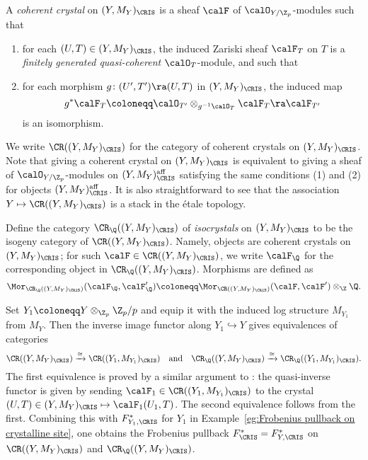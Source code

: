 \begin{defn}
A \emph{coherent crystal} on $(Y,M_Y)_\CRIS$ is a sheaf $\calF$ of $\calO_{Y/\Z_p}$-modules such that 
\begin{enumerate}
    \item for each $(U,T)\in (Y,M_Y)_\CRIS$, the induced Zariski sheaf $\calF_T$ on $T$ is a \emph{finitely generated quasi-coherent} $\calO_T$-module, and such that
    \item for each morphism $g\colon (U',T')\ra (U,T)$ in $(Y,M_Y)_\CRIS$, the induced map
    \[
    g^\ast\calF_T\coloneqq \calO_{T'}\otimes_{g^{-1}\calO_T}\calF_T\ra \calF_{T'}
    \]
    is an isomorphism.
\end{enumerate}
We write $\CR((Y,M_Y)_\CRIS)$ for the category of coherent crystals on $(Y,M_Y)_\CRIS$. 
Note that giving a coherent crystal on $(Y,M_Y)_\CRIS$ is equivalent to giving a sheaf of $\calO_{Y/\Z_p}$-modules on $(Y,M_Y)_{\CRIS}^{\mathrm{aff}}$ satisfying the same conditions (1) and (2) for objects $(Y,M_Y)_{\CRIS}^{\mathrm{aff}}$. It is also straightforward to see that the association $Y\mapsto \CR((Y,M_Y)_\CRIS)$ is a stack in the \'etale topology. 
\end{defn}



\begin{defn}\label{defn:crystallineisocrystal}
Define the category $\CR_\Q((Y,M_Y)_\CRIS)$ of \emph{isocrystals} on $(Y,M_Y)_\CRIS$ to be the isogeny category of $\CR((Y,M_Y)_\CRIS)$. Namely, objects are coherent crystals on $(Y,M_Y)_\CRIS$; for such $\calF\in \CR((Y,M_Y)_\CRIS)$, we write $\calF_\Q$ for the corresponding object in $\CR_\Q((Y,M_Y)_\CRIS)$. Morphisms are defined as
\[
\Mor_{\CR_\Q((Y,M_Y)_\CRIS)}(\calF_\Q,\calF'_\Q)\coloneqq 
\Mor_{\CR((Y,M_Y)_\CRIS)}(\calF,\calF')\otimes_\Z \Q.
\]
\end{defn}


\begin{rem}
Set $Y_1\coloneqq Y\otimes_{\Z_p} \Z_p/p$ and equip it with the induced log structure $M_{Y_1}$ from $M_Y$. Then the inverse image functor along $Y_1\hookrightarrow Y$ gives equivalences of categories
\[
\CR((Y,M_Y)_\CRIS)\xrightarrow{\cong}\CR((Y_1,M_{Y_1})_\CRIS)
\quad\text{and}\quad 
\CR_\Q((Y,M_Y)_\CRIS)\xrightarrow{\cong}\CR_\Q((Y_1,M_{Y_1})_\CRIS).
\]
The first equivalence is proved by a similar argument to \cite[Thm.~IV.1.4.1]{Berthelot-book}: the quasi-inverse functor is given by sending $\calF_1\in \CR((Y_1,M_{Y_1})_\CRIS)$ to the crystal $(U,T)\in (Y,M_Y)_\CRIS\mapsto \calF_1(U_1,T)$. The second equivalence follows from the first.
Combining this with $F_{Y_1,\CRIS}^\ast$ for $Y_1$ in Example~\ref{eg:Frobenius pullback on crystalline site}, one obtains the Frobenius pullback $F_\CRIS^\ast=F_{Y,\CRIS}^\ast$ on $\CR((Y,M_Y)_\CRIS)$ and $\CR_\Q((Y,M_Y)_\CRIS)$.
\end{rem}


